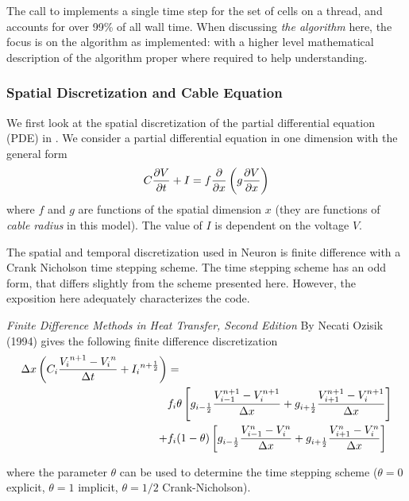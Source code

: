 The call to  implements a single time step for the set of cells on a thread, and accounts for over 99\% of all wall time. When discussing \emph{the algorithm} here, the focus is on the algorithm as implemented: with a higher level mathematical description of the algorithm proper where required to help understanding.

\subsubsection{Spatial Discretization and Cable Equation}
We first look at the spatial discretization of the partial differential equation (PDE) in \neuron. We consider a partial differential equation in one dimension with the general form
\begin{equation}
     C\frac{\partial{V}}{\partial{t}} + I = f \frac{\partial{}}{\partial{x}} \left( g\frac{\partial{V}}{\partial{x}} \right)
\end{equation}
where $f$ and $g$ are functions of the spatial dimension $x$ (they are functions of \emph{cable radius} in this model). The value of $I$ is dependent on the voltage $V$.

The spatial and temporal discretization used in Neuron is finite difference with a Crank Nicholson time stepping scheme. The time stepping scheme has an odd form, that differs slightly from the scheme presented here. However, the exposition here adequately characterizes the code.

\emph{Finite Difference Methods in Heat Transfer, Second Edition} By Necati Ozisik (1994) gives the following finite difference discretization
\begin{align}
    {\Delta x} \left({C}_{i} \frac{{{V}_{i}}^{n+1} - {{V}_{i}}^{n}}{{\Delta t}} + {{I}_{i}}^{n+\frac{1}{2}} \right)
    &=\nonumber \\
    & {f}_{i} \theta
            \left[
                {g}_{i-\frac{1}{2}} \frac{{V}_{i-1}^{n+1}-{V}_{i}^{n+1}}{{\Delta x}}
              + {g}_{i+\frac{1}{2}}  \frac{{V}_{i+1}^{n+1}-{V}_{i}^{n+1}}{{\Delta x}}
            \right] \nonumber \\
            + & {f}_{i} (1-\theta)
            \left[
                {g}_{i-\frac{1}{2}} \frac{{V}_{i-1}^{n}-{V}_{i}^{n}}{{\Delta x}}
              + {g}_{i+\frac{1}{2}}  \frac{{V}_{i+1}^{n}-{V}_{i}^{n}}{{\Delta x}}
            \right]
        \label{eq:cableDiscretization}
\end{align}

where the parameter $\theta$ can be used to determine the time stepping scheme ($\theta=0$ explicit, $\theta=1$ implicit, $\theta=1/2$ Crank-Nicholson).

